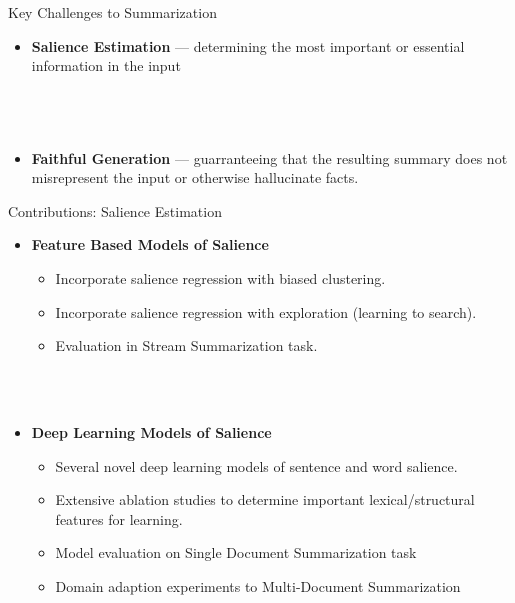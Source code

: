 \begin{frame}{Key Challenges to Summarization}

\begin{itemize}

    \item \textbf{Salience Estimation} --- determining the most important or essential 
information in the input
~\\
~\\
~\\
~\\
\item \textbf{Faithful Generation} --- guarranteeing that the resulting summary does not misrepresent the input or otherwise hallucinate facts.

\end{itemize}

\end{frame}


\begin{frame}{Contributions: Salience Estimation}

\begin{itemize}

    \item \textbf{Feature Based Models of Salience} 
        \begin{itemize}
            \item Incorporate salience regression with biased clustering.
            \item Incorporate salience regression with exploration (learning to search).
            \item Evaluation in \alert{Stream Summarization} task.
        \end{itemize}
        ~\\
        ~\\
    \item \textbf{Deep Learning Models of Salience}
        \begin{itemize}
            \item Several novel deep learning models of sentence and 
                word salience.
            \item Extensive ablation studies to determine important 
                lexical/structural features for learning.
           \item Model evaluation on \alert{Single Document Summarization} task
           \item Domain adaption experiments to 
               \alert{Multi-Document Summarization}
        \end{itemize}

\end{itemize}



\end{frame}

